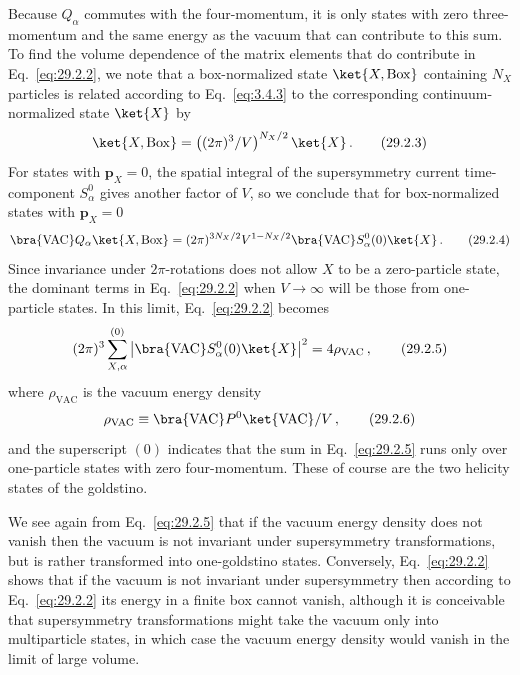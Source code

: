 Because \(Q_\alpha\) commutes with the four-momentum, it is only states
with zero three-momentum and the same energy as the vacuum that can
contribute to this sum. To find the volume dependence of the matrix
elements that do contribute in Eq.~\eqref{eq:29.2.2}, we note that a
box-normalized state \(\ket{X,\mathrm{Box}}\) containing \(N_X\)
particles is related according to Eq.~\eqref{eq:3.4.3} to the
corresponding continuum-normalized state \(\ket{X}\) by
\begin{equation}
  \ket{X,\mathrm{Box}}
  =\left((2\pi)^3/V\right)^{N_X/2}\ket{X}\,.
  \tag{29.2.3}\label{eq:29.2.3}
\end{equation}
For states with \(\mathbf p_X=0\), the spatial integral of the
supersymmetry current time-component \(S_\alpha^0\) gives another factor
of \(V\), so we conclude that for box-normalized states with
\(\mathbf p_X=0\)
\begin{equation}
  \bra{\mathrm{VAC}} Q_\alpha\ket{X,\mathrm{Box}}
  =(2\pi)^{3N_X/2}V^{1-N_X/2}
  \bra{\mathrm{VAC}} S_\alpha^0(0)\ket{X}\,.
  \tag{29.2.4}\label{eq:29.2.4}
\end{equation}
Since invariance under \(2\pi\)-rotations does not allow \(X\) to be a
zero-particle state, the dominant terms in Eq.~\eqref{eq:29.2.2} when
\(V\to\infty\) will be those from one-particle states. In this limit,
Eq.~\eqref{eq:29.2.2} becomes
\begin{equation}
  (2\pi)^3\sum_{X,\alpha}^{(0)}
  \left\lvert
    \bra{\mathrm{VAC}} S_\alpha^0(0)\ket{X}
  \right\rvert^2
  =4\rho_{\mathrm{VAC}}\,,
  \tag{29.2.5}\label{eq:29.2.5}
\end{equation}
where \(\rho_{\mathrm{VAC}}\) is the vacuum energy density
\begin{equation}
  \rho_{\mathrm{VAC}}
  \equiv
  \bra{\mathrm{VAC}} P^0\ket{\mathrm{VAC}}/V\,,
  \tag{29.2.6}\label{eq:29.2.6}
\end{equation}
and the superscript \((0)\) indicates that the sum in
Eq.~\eqref{eq:29.2.5} runs only over one-particle states with zero
four-momentum. These of course are the two helicity states of the
goldstino.

We see again from Eq.~\eqref{eq:29.2.5} that if the vacuum energy density
does not vanish then the vacuum is not invariant under supersymmetry
transformations, but is rather transformed into one-goldstino states.
Conversely, Eq.~\eqref{eq:29.2.2} shows that if the vacuum is not invariant
under supersymmetry then according to Eq.~\eqref{eq:29.2.2} its energy in
a finite box cannot vanish, although it is conceivable that supersymmetry
transformations might take the vacuum only into multiparticle states, in
which case the vacuum energy density would vanish in the limit of large
volume.

